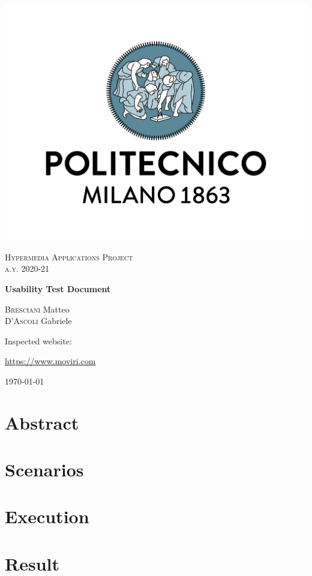 \documentclass[fontsize=11pt,paper=a4,pagesize=auto]{report}
\begin{document}
\begin{titlepage}
	\centering
	\includegraphics[scale = 0.25]{images/polimi.jpg}\par
	
	{\scshape\Large
		Hypermedia Applications Project\\
		a.y. 2020-21\par}
			\vspace{0.5cm}
	{\huge\bfseries
		Usability Test Document\\\par}

	\vspace{1cm}
	{\Large
		{\scshape Bresciani} Matteo\\
		{\scshape D'Ascoli}  Gabriele\par

		}
			\vspace{1cm}

		{\huge\Large
		Inspected website:}\\
					\vspace{0.5cm}

		\huge{\url{https://www.moviri.com}}
		
	
\vspace{0.5cm}
	{\large\today\par}
\end{titlepage}


\tableofcontents
\chapter{Abstract}



\chapter{Scenarios}



\chapter{Execution}





\chapter{Result}

\end{document}
